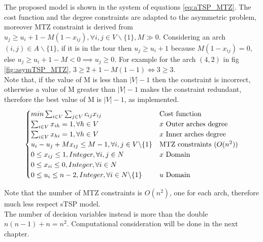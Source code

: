 The proposed model is shown in the system of equations \ref{eq:aTSP_MTZ}. The cost function and the degree constraints are adapted to the asymmetric problem, moreover MTZ constraint is derived from $ u_j \ge u_i+1-M(1-x_{ij}), \forall i,j \in V \backslash \{1\}, M \gg 0 $. Considering an arch $ (i,j) \in A \backslash \{1\} $, if it is in the tour then $ u_j \ge u_i + 1 $ because $ M(1-x_{ij}) = 0 $, else $ u_j \ge u_i + 1 - M < 0 \implies u_j \ge 0 $. For example for the arch $ (4,2) $ in fig \ref{fig:asymTSP_MTZ}, $ 3 \ge 2 + 1 - M(1-1) \iff 3 \ge 3 $. \\
Note that, if the value of M is less than $|V| - 1$  then the constraint is incorrect, otherwise a value of M greater than $|V| - 1 $ makes the constraint redundant, therefore the best value of M is $|V| - 1$, as implemented. \\
\begin{equation}
\begin{cases}
min \sum_{i\in V}\sum_{j\in V} c_{ij}x_{ij} & \text{Cost function} \\
\sum_{i\in V} x_{ih} = 1, \forall h \in V  & \text{$ x $ Outer arches degree} \\
\sum_{i\in V} x_{hi} = 1, \forall h \in V  & \text{$ x $ Inner arches degree} \\
u_i -u_j +M x_{ij} \le M - 1, \forall i,j \in V \backslash \{1\} & \text{MTZ constraints ($ O(n^2) $)} \\
0 \le x_{ij} \le 1, Integer, \forall i,j \in N  & \text{$ x $ Domain} \\
0 \le x_{ii} \le 0, Integer, \forall i \in N  & \text{} \\
0 \le u_{i} \le n-2, Integer, \forall i \in N \backslash \{1\} & \text{$ u $ Domain} 
\end{cases}
\label{eq:aTSP_MTZ}
\end{equation}


Note that the number of MTZ constraints is $ O(n^2) $, one for each arch, therefore much less respect sTSP model.\\
The number of decision variables instead is more than the double $ n(n-1) + n = n^2 $. Computational consideration will be done in the next chapter.


